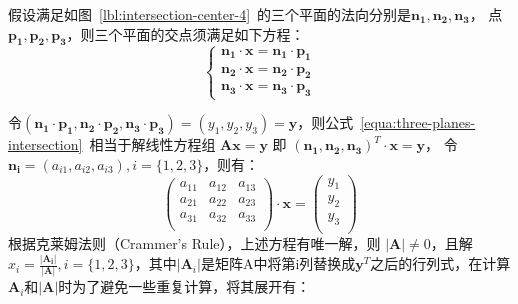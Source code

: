 假设满足如图~\ref{lbl:intersection-center-4}~的三个平面的法向分别是$\bm{n_1}, \bm{n_2}, \bm{n_3}$，
点$\bm{p_1}, \bm{p_2}, \bm{p_3}$，则三个平面的交点须满足如下方程： 
\begin{equation}
  \label{equa:three-planes-intersection}
  \left\{
    \begin{array}{l}
      \bm{n_1} \cdot \bm{x} = \bm{n_1} \cdot \bm{p_1}\\
      \bm{n_2} \cdot \bm{x} = \bm{n_2} \cdot \bm{p_2}\\
      \bm{n_3} \cdot \bm{x} = \bm{n_3} \cdot \bm{p_3}
    \end{array}
    \right.
\end{equation}

令$(\bm{n_1} \cdot \bm{p_1}, \bm{n_2} \cdot \bm{p_2}, \bm{n_3} \cdot \bm{p_3})
= (y_1, y_2, y_3) = \bm{y}$，则公式~\ref{equa:three-planes-intersection}~相当于解线性方程组
$\bm{A} \bm{x}=\bm{y}$ 即 $(\bm{n_1},\bm{n_2}, \bm{n_3})^T \cdot \bm{x} = \bm{y}$， 令
$\bm{n_i} = (a_{i1}, a_{i2}, a_{i3}), i=\{1,2,3\}$，则有：
\begin{equation*}
  \label{equa:matrix:crammer}
  \left(
    \begin{array}{ccc}
      a_{11} & a_{12} & a_{13} \\
      a_{21} & a_{22} & a_{23} \\
      a_{31} & a_{32} & a_{33} \\
    \end{array}
  \right)
  \cdot 
  \bm{x} 
  =
  \left(
    \begin{array}{c}
      y_{1} \\
      y_{2} \\
      y_{3} \\
    \end{array}
  \right)
\end{equation*}
根据克莱姆法则（Crammer's Rule），上述方程有唯一解，则
$|\bm{A}| \not= 0$，且解~$x_i = \frac{|\bm{A_i}|}{|\bm{A}|}, i =
\{1,2,3\}$，其中$|\bm{A}_i|$是矩阵A中将第i列替换成$\bm{y}^T$之后的行列式，在计算$\bm{A}_i$和$|\bm{A}|$时为了避免一些重复计算，将其展开有：
